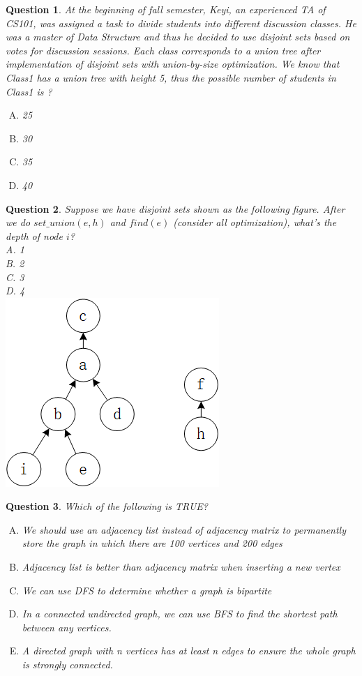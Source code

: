 \documentclass{article}
\newtheorem{Q}{Question}
\begin{document}
\begin{Q}
At the beginning of fall semester, Keyi, an experienced TA of CS101, was assigned a task to divide students into different discussion classes. He was a master of Data Structure and thus he decided to use disjoint sets based on votes for discussion sessions. Each class corresponds to a union tree after implementation of disjoint sets with union-by-size optimization. We know that Class1 has a union tree with height 5, thus the possible number of students in Class1 is ?     
\begin{enumerate}[(A)]
	\item 25
	\item 30
	\item 35
	\item 40
\end{enumerate}
\end{Q}
\begin{Q}
Suppose we have disjoint sets shown as the following figure. 
After we do $set\_union(e,h)$ and $find(e)$   (consider all optimization), what's the depth of node $i$?\\
A. 1 \\
B. 2 \\
C. 3 \\
D. 4 \\
\includegraphics[scale =0.6]{fig2.png} \\
\end{Q}

\begin{Q}
Which of the following is TRUE?
\begin{enumerate}[(A)]
\item We should use an adjacency list instead of adjacency matrix to permanently store the graph in which there are 100 vertices and 200 edges 
\item Adjacency list is better than adjacency matrix when inserting a new vertex
\item We can use DFS to determine whether a graph is bipartite
\item In a connected undirected graph, we can use BFS to find the shortest path between any vertices. 
\item A directed graph with n vertices has at least n  edges to ensure the whole graph is strongly connected.
\end{enumerate}
\end{Q}
\pagebreak
\end{document}
